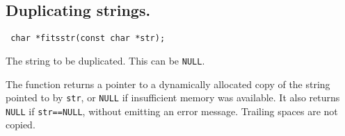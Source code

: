 \subsection{Duplicating strings.}

\label{fitsstr}\begin{verbatim}
 char *fitsstr(const char *str);
\end{verbatim}

\begin{arglist}
 The string to be duplicated. This can be \verb`NULL`.
\end{arglist}

The function returns a pointer to a dynamically allocated copy of
the string pointed to by \verb`str`, or \verb`NULL` if insufficient
memory was available. It also returns \verb`NULL` if \verb`str==NULL`,
without emitting an error message. Trailing spaces are not copied.


